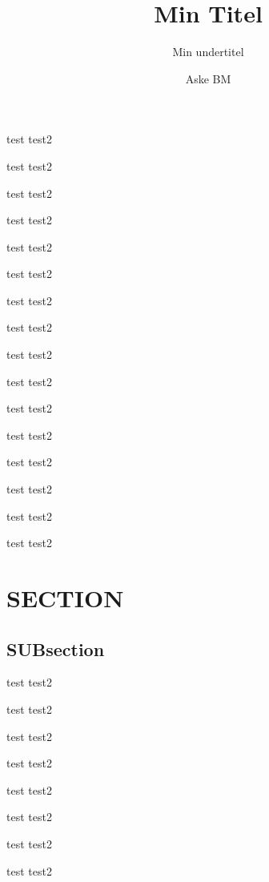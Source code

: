 \documentclass[aspectratio=169]{beamer}
\title{Min Titel}
\subtitle{Min undertitel}
\institute{Teknisk Fakultet Syddansk Universitet}
\author{Aske BM}
\newcommand\TestFr{\begin{frame}
test
\pause%
test2

\end{frame}}
\begin{document}
\begin{frame}[plain]
	\titlepage%
\end{frame}
\TestFr\TestFr\TestFr\TestFr\TestFr\TestFr\TestFr\TestFr%
\TestFr\TestFr\TestFr\TestFr\TestFr\TestFr\TestFr\TestFr%
\section{SECTION}%
\label{sec:section}

\subsection{SUBsection}%
\label{sub:subsection}

\TestFr\TestFr\TestFr\TestFr\TestFr\TestFr\TestFr\TestFr%
\end{document}
